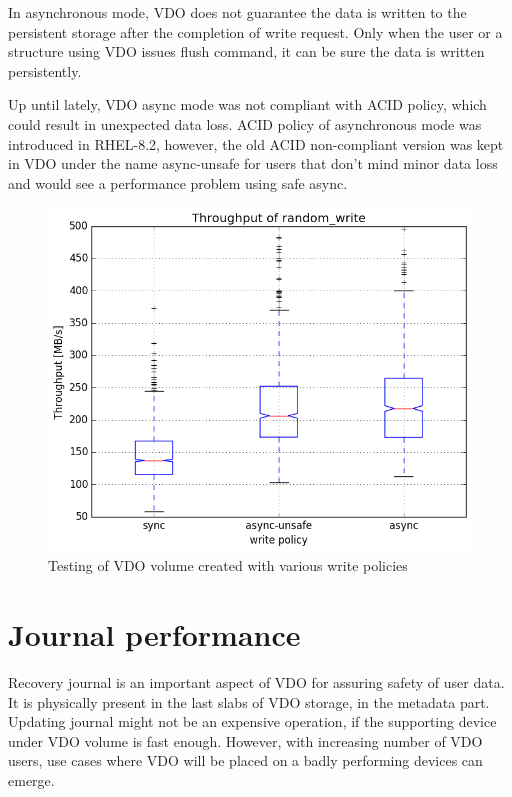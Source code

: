 \documentclass[
  color, %
  table, %
  lof,   %
  lot,   %
]{fithesis3}
\begin{document}
In asynchronous mode, VDO does not guarantee the data is written to the persistent storage after the completion of write request. Only when the user or a structure using VDO issues flush command, it can be sure the data is written persistently.

Up until lately, VDO async mode was not compliant with ACID policy, which could result in unexpected data loss. ACID policy of asynchronous mode was introduced in RHEL-8.2, however, the old ACID non-compliant version was kept in VDO under the name async-unsafe for users that don't mind minor data loss and would see a performance problem using safe async.

\begin{figure}[!htb]
        \centering
        \includegraphics[width=\textwidth]{../results/write_policies/report/random_write1_compare_boxplots}
\caption[write policies]{Testing of VDO volume created with various write policies}
\label{fig:writepolicies}
\end{figure}




\section{Journal performance}
Recovery journal is an important aspect of VDO for assuring safety of user data. It is physically present in the last slabs of VDO storage, in the metadata part. Updating journal might not be an expensive operation, if the supporting device under VDO volume is fast enough. However, with increasing number of VDO users, use cases where VDO will be placed on a badly performing devices can emerge.
\end{document}
